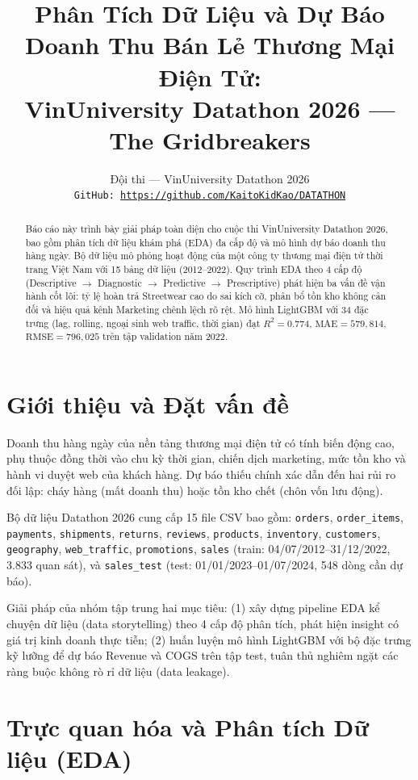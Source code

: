 \documentclass{article}
\title{Phân Tích Dữ Liệu và Dự Báo Doanh Thu Bán Lẻ Thương Mại Điện Tử:\\VinUniversity Datathon 2026 — The Gridbreakers}
\author{%
  Đội thi — VinUniversity Datathon 2026 \\
  \texttt{GitHub: \url{https://github.com/KaitoKidKao/DATATHON}} \\
}
\begin{document}
\maketitle

\begin{abstract}
Báo cáo này trình bày giải pháp toàn diện cho cuộc thi VinUniversity Datathon 2026, bao gồm phân tích dữ liệu khám phá (EDA) đa cấp độ và mô hình dự báo doanh thu hàng ngày. Bộ dữ liệu mô phỏng hoạt động của một công ty thương mại điện tử thời trang Việt Nam với 15 bảng dữ liệu (2012--2022). Quy trình EDA theo 4 cấp độ (Descriptive $\to$ Diagnostic $\to$ Predictive $\to$ Prescriptive) phát hiện ba vấn đề vận hành cốt lõi: tỷ lệ hoàn trả Streetwear cao do sai kích cỡ, phân bổ tồn kho không cân đối và hiệu quả kênh Marketing chênh lệch rõ rệt. Mô hình LightGBM với 34 đặc trưng (lag, rolling, ngoại sinh web traffic, thời gian) đạt $R^2 = 0.774$, $\text{MAE} = 579{,}814$, $\text{RMSE} = 796{,}025$ trên tập validation năm 2022.
\end{abstract}

\section{Giới thiệu và Đặt vấn đề}

Doanh thu hàng ngày của nền tảng thương mại điện tử có tính biến động cao, phụ thuộc đồng thời vào chu kỳ thời gian, chiến dịch marketing, mức tồn kho và hành vi duyệt web của khách hàng. Dự báo thiếu chính xác dẫn đến hai rủi ro đối lập: cháy hàng (mất doanh thu) hoặc tồn kho chết (chôn vốn lưu động).

Bộ dữ liệu Datathon 2026 cung cấp 15 file CSV bao gồm: \texttt{orders}, \texttt{order\_items}, \texttt{payments}, \texttt{shipments}, \texttt{returns}, \texttt{reviews}, \texttt{products}, \texttt{inventory}, \texttt{customers}, \texttt{geography}, \texttt{web\_traffic}, \texttt{promotions}, \texttt{sales} (train: 04/07/2012--31/12/2022, 3.833 quan sát), và \texttt{sales\_test} (test: 01/01/2023--01/07/2024, 548 dòng cần dự báo).

Giải pháp của nhóm tập trung hai mục tiêu: (1) xây dựng pipeline EDA kể chuyện dữ liệu (data storytelling) theo 4 cấp độ phân tích, phát hiện insight có giá trị kinh doanh thực tiễn; (2) huấn luyện mô hình LightGBM với bộ đặc trưng kỹ lưỡng để dự báo Revenue và COGS trên tập test, tuân thủ nghiêm ngặt các ràng buộc không rò rỉ dữ liệu (data leakage).

\section{Trực quan hóa và Phân tích Dữ liệu (EDA)}
\end{document}
